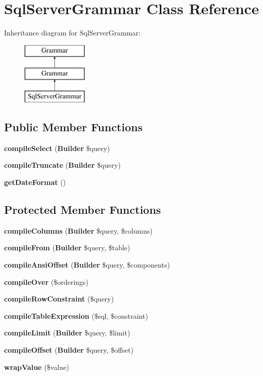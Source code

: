 \section{Sql\+Server\+Grammar Class Reference}
\label{class_illuminate_1_1_database_1_1_query_1_1_grammars_1_1_sql_server_grammar}
Inheritance diagram for Sql\+Server\+Grammar\+:\begin{figure}[H]
\begin{center}
\leavevmode
\includegraphics[height=3.000000cm]{class_illuminate_1_1_database_1_1_query_1_1_grammars_1_1_sql_server_grammar}
\end{center}
\end{figure}
\subsection*{Public Member Functions}
\begin{DoxyCompactItemize}
\item 
{\bf compile\+Select} ({\bf Builder} \$query)
\item 
{\bf compile\+Truncate} ({\bf Builder} \$query)
\item 
{\bf get\+Date\+Format} ()
\end{DoxyCompactItemize}
\subsection*{Protected Member Functions}
\begin{DoxyCompactItemize}
\item 
{\bf compile\+Columns} ({\bf Builder} \$query, \$columns)
\item 
{\bf compile\+From} ({\bf Builder} \$query, \$table)
\item 
{\bf compile\+Ansi\+Offset} ({\bf Builder} \$query, \$components)
\item 
{\bf compile\+Over} (\$orderings)
\item 
{\bf compile\+Row\+Constraint} (\$query)
\item 
{\bf compile\+Table\+Expression} (\$sql, \$constraint)
\item 
{\bf compile\+Limit} ({\bf Builder} \$query, \$limit)
\item 
{\bf compile\+Offset} ({\bf Builder} \$query, \$offset)
\item 
{\bf wrap\+Value} (\$value)
\end{DoxyCompactItemize}
